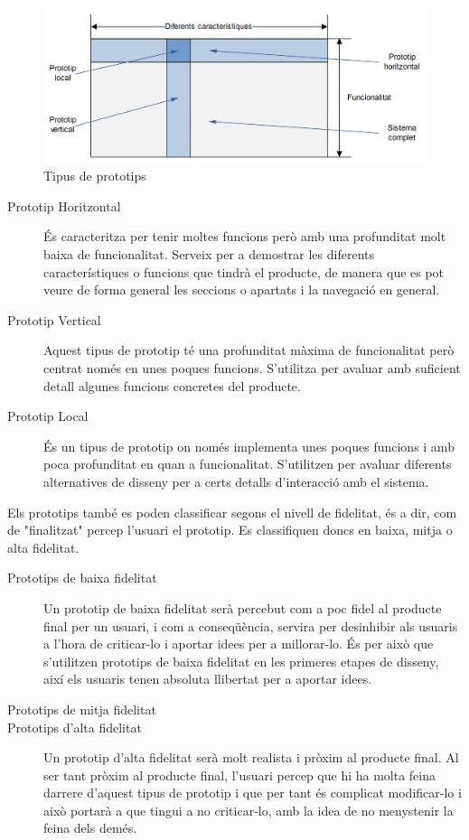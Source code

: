 \begin{figure}[ht]
\centering
\includegraphics[scale=0.8]{Types_prototypes.png}
\caption{Tipus de prototips}\label{fig:types_prototypes}
\end{figure}

\begin{description}
\item[Prototip Horitzontal] És caracteritza per tenir moltes funcions però amb una profunditat molt baixa de funcionalitat. Serveix per a demostrar les diferents característiques o funcions que tindrà el producte, de manera que es pot veure de forma general les seccions o apartats i la navegació en general.
\item[Prototip Vertical] Aquest tipus de prototip té una profunditat màxima de funcionalitat però centrat només en unes poques funcions. S'utilitza per avaluar amb suficient detall algunes funcions concretes del producte. 
\item[Prototip Local] És un tipus de prototip on només implementa unes poques funcions i amb poca profunditat en quan a funcionalitat. S'utilitzen per avaluar diferents alternatives de disseny per a certs detalls d'interacció amb el sistema. 
\end{description}

Els prototips també es poden classificar segons el nivell de fidelitat, és a dir, com de "finalitzat" percep l'usuari el prototip. Es classifiquen doncs en baixa, mitja o alta fidelitat.  

\begin{description}
\item[Prototips de baixa fidelitat] Un prototip de baixa fidelitat serà percebut com a poc fidel al producte final per un usuari, i com a conseqüència, servira per desinhibir als usuaris a l'hora de criticar-lo i aportar idees per a millorar-lo. És per això que s'utilitzen prototips de baixa fidelitat en les primeres etapes de disseny, així els usuaris tenen absoluta llibertat per a aportar idees.
\item[Prototips de mitja fidelitat]
\item[Prototips d'alta fidelitat] Un prototip d'alta fidelitat serà molt realista i pròxim al producte final. Al ser tant pròxim al producte final, l'usuari percep que hi ha molta feina darrere d'aquest tipus de prototip i que per tant és complicat modificar-lo i això portarà a que tingui a no criticar-lo, amb la idea de no menystenir la feina dels demés. 
\end{description}


